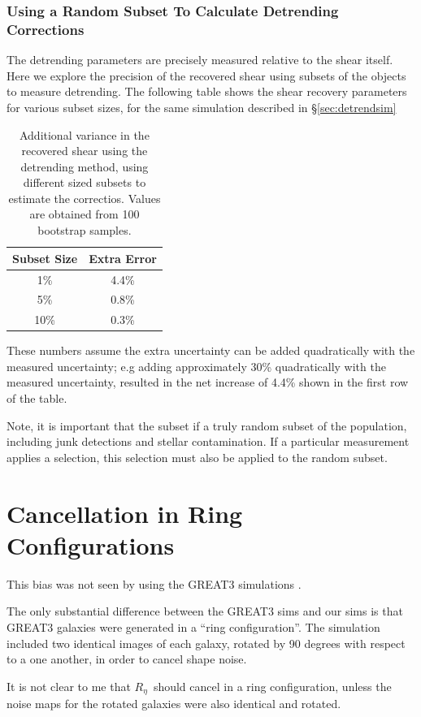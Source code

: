 \documentclass[usegraphicx,usenatbib]{mn2e}
\newcommand{\mcalRnoise}{$R_\eta$}
\begin{document}
\subsubsection{Using a Random Subset To Calculate Detrending Corrections}

The detrending parameters are precisely measured relative to the shear itself.
Here we explore the precision of the recovered shear using subsets of
the objects to measure detrending.  The following table shows the
shear recovery parameters for various subset sizes, for the same simulation
described in \S \ref{sec:detrendsim}

\begin{table}[h]
    \centering
    \caption{Additional variance in the recovered shear using the
        detrending method, using different sized subsets to
        estimate the correctios.  Values are obtained
        from 100 bootstrap samples.}
    \begin{tabular}{| c | c |}
        Subset Size & Extra Error \\
        \hline
        1\% & 4.4\% \\
        5\% & 0.8\% \\
        10\% & 0.3\% \\
    \end{tabular}
\end{table}


These numbers assume the extra uncertainty can be added quadratically with the
measured uncertainty; e.g adding approximately 30\% quadratically with the
measured uncertainty, resulted in the net increase of 4.4\% shown in the first
row of the table.

Note, it is important that the subset if a truly random subset of the
population, including junk detections and stellar contamination.  If
a particular measurement applies a selection, this selection must
also be applied to the random subset.

\section{Cancellation in Ring Configurations}

This bias was not seen by \cite{HuffMcal} using the GREAT3 simulations
\citep{great3}.

The only substantial difference between the GREAT3 sims and our sims is that
GREAT3 galaxies were generated in a ``ring configuration''.  The simulation
included two identical images of each galaxy, rotated by 90 degrees with
respect to a one another, in order to cancel shape noise.

It is not clear to me that \mcalRnoise\ should cancel in a ring configuration,
unless the noise maps for the rotated galaxies were also identical and rotated.





\end{document}
